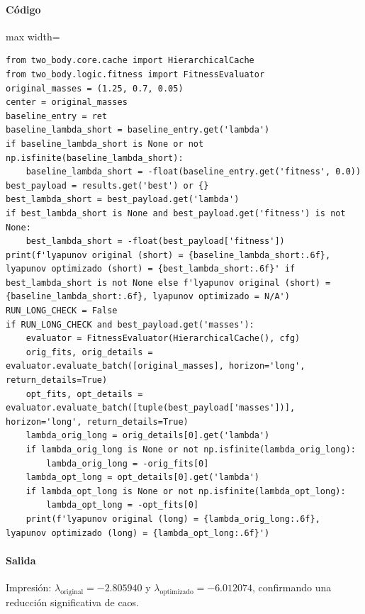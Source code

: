 \paragraph{Código}
\begin{listing}[H]
\caption{Celda 24: estimación corta vs.\ solución optimizada}
\label{lst:c04_cell24}
\begin{adjustbox}{max width=\textwidth}
\begin{minipage}{\textwidth}
\begin{verbatim}
from two_body.core.cache import HierarchicalCache
from two_body.logic.fitness import FitnessEvaluator
original_masses = (1.25, 0.7, 0.05)
center = original_masses
baseline_entry = ret
baseline_lambda_short = baseline_entry.get('lambda')
if baseline_lambda_short is None or not np.isfinite(baseline_lambda_short):
    baseline_lambda_short = -float(baseline_entry.get('fitness', 0.0))
best_payload = results.get('best') or {}
best_lambda_short = best_payload.get('lambda')
if best_lambda_short is None and best_payload.get('fitness') is not None:
    best_lambda_short = -float(best_payload['fitness'])
print(f'lyapunov original (short) = {baseline_lambda_short:.6f}, lyapunov optimizado (short) = {best_lambda_short:.6f}' if best_lambda_short is not None else f'lyapunov original (short) = {baseline_lambda_short:.6f}, lyapunov optimizado = N/A')
RUN_LONG_CHECK = False
if RUN_LONG_CHECK and best_payload.get('masses'):
    evaluator = FitnessEvaluator(HierarchicalCache(), cfg)
    orig_fits, orig_details = evaluator.evaluate_batch([original_masses], horizon='long', return_details=True)
    opt_fits, opt_details = evaluator.evaluate_batch([tuple(best_payload['masses'])], horizon='long', return_details=True)
    lambda_orig_long = orig_details[0].get('lambda')
    if lambda_orig_long is None or not np.isfinite(lambda_orig_long):
        lambda_orig_long = -orig_fits[0]
    lambda_opt_long = opt_details[0].get('lambda')
    if lambda_opt_long is None or not np.isfinite(lambda_opt_long):
        lambda_opt_long = -opt_fits[0]
    print(f'lyapunov original (long) = {lambda_orig_long:.6f}, lyapunov optimizado (long) = {lambda_opt_long:.6f}')
\end{verbatim}
\end{minipage}
\end{adjustbox}
\end{listing}
\paragraph{Salida} Impresión: $\lambda_{\text{original}} = -2.805940$ y $\lambda_{\text{optimizado}} = -6.012074$, confirmando una reducción significativa de caos.

